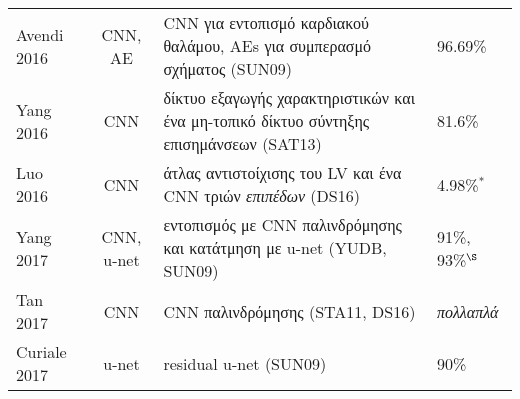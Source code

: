 \begin{sidewaystable}
\begin{tabular}{l c l l}
		Avendi 2016~\cite{avendi2016combined}       & CNN, AE         & CNN για εντοπισμό καρδιακού θαλάμου, AEs για συμπερασμό σχήματος (SUN09) & 96.69\%                                                                                                                                                                                                                                         \\
		Yang 2016~\cite{yang2016deep}               & CNN             & δίκτυο εξαγωγής χαρακτηριστικών και ένα μη-τοπικό δίκτυο σύντηξης επισημάνσεων (SAT13)                     & 81.6\%                                                                                                                                                                                                                                          \\
		Luo 2016~\cite{luo2016cardiac}              & CNN             & άτλας αντιστοίχισης του LV και ένα CNN τριών \textit{επιπέδων} (DS16)                                      & 4.98\%$^*$                                                                                                                                                                                                                                      \\
		Yang 2017~\cite{yang2017deep}               & CNN, u-net      & εντοπισμός με CNN παλινδρόμησης και κατάτμηση με u-net (YUDB, SUN09)                                       & 91\%, 93\%$^\S$                                                                                                                                                                                                                                 \\
		Tan 2017~\cite{tan2017convolutional}        & CNN             & CNN παλινδρόμησης (STA11, DS16)                                                                            & \textit{πολλαπλά}                                                                                                                                                                                                                               \\
		Curiale 2017~\cite{curiale2017automatic}    & u-net           & residual u-net (SUN09)                                                                                     & 90\%                                                                                                                                                                                                                                            \\

\end{tabular}
\end{sidewaystable}
